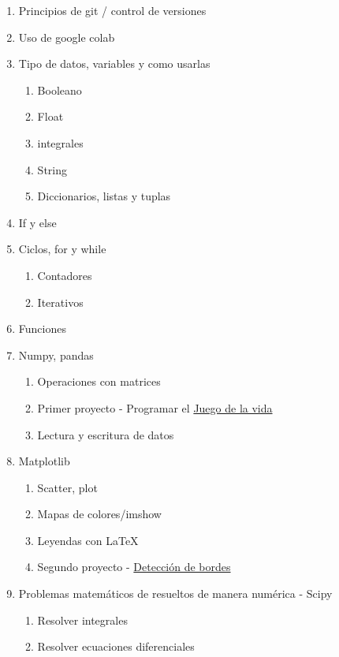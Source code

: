 \documentclass[12pt,letterpaper]{article}
\begin{document}
\begin{enumerate}
    \item Principios de git / control de versiones
    \item Uso de google colab
    \item Tipo de datos, variables y como usarlas
    \begin{enumerate}
        \item Booleano
        \item Float
        \item integrales
        \item String
        \item Diccionarios, listas y tuplas
    \end{enumerate}
    \item If y else
    \item Ciclos, for y while
    \begin{enumerate}
        \item Contadores
        \item Iterativos
    \end{enumerate}
    \item Funciones
    \item Numpy, pandas
    \begin{enumerate}
        \item Operaciones con matrices
        \item Primer proyecto - Programar el \href{https://en.wikipedia.org/wiki/Conway%27s_Game_of_Life}{Juego de la vida}
        \item Lectura y escritura de datos
    \end{enumerate}
    \item Matplotlib
    \begin{enumerate}
        \item Scatter, plot
        \item Mapas de colores/imshow
        \item Leyendas con LaTeX
        \item Segundo proyecto - \href{https://en.wikipedia.org/wiki/Edge_detection}{Detección de bordes}
    \end{enumerate}
    \item Problemas matemáticos de resueltos de manera numérica - Scipy
    \begin{enumerate}
        \item Resolver integrales
        \item Resolver ecuaciones diferenciales

\end{enumerate}
\end{enumerate}
\end{document}
